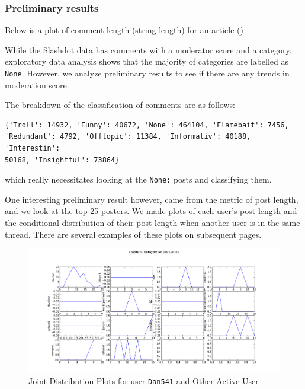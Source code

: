 \documentclass[a4paper,12pt]{article}
\numberwithin{equation}{section}
\begin{document}





\subsubsection*{Preliminary results}
Below is a plot of comment length (string length) for an article ()






While the Slashdot data has comments with a moderator score and a category, exploratory data analysis shows that the majority of categories are labelled as {\tt None}. However, we analyze preliminary results to see if there are any trends in moderation score.


The breakdown of the classification of comments are as follows:
\vspace*{-0.5cm}
\begin{verbatim}
{'Troll': 14932, 'Funny': 40672, 'None': 464104, 'Flamebait': 7456, 
'Redundant': 4792, 'Offtopic': 11384, 'Informativ': 40188, 'Interestin': 
50168, 'Insightful': 73864}
\end{verbatim}
which really necessitates looking at the {\tt None:} posts and classifying them. 

One interesting preliminary result however, came from the metric of post length, and we look at the top 25 posters. We made plots of each user's post length and the conditional distribution of their post length when another user is in the same thread. There are several examples of these plots on subsequent pages.

\begin{figure}[here!]
\begin{center}
\includegraphics[scale=0.46, angle = 90]{Dan541.png}
\caption{Joint Distribution Plots for user {\tt Dan541} and Other Active User}
\end{center}
\end{figure}
\end{document}
